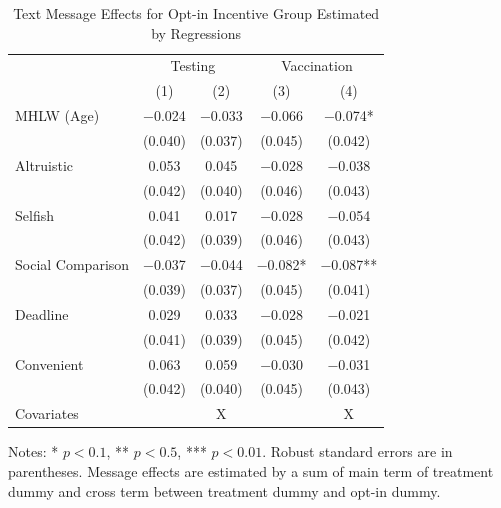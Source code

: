 \documentclass[
]{article}
\begin{document}
\begin{table}

\caption{\label{tab:lh-int}Text Message Effects for Opt-in Incentive Group Estimated by Regressions}
\centering
\fontsize{9}{11}\selectfont
\begin{threeparttable}
\begin{tabular}[t]{lcccc}
\toprule
\multicolumn{1}{c}{ } & \multicolumn{2}{c}{Testing} & \multicolumn{2}{c}{Vaccination} \\
\cmidrule(l{3pt}r{3pt}){2-3} \cmidrule(l{3pt}r{3pt}){4-5}
  & (1) & (2) & (3) & (4)\\
\midrule
MHLW (Age) & \num{-0.024} & \num{-0.033} & \num{-0.066} & \num{-0.074}*\\
 & (\num{0.040}) & (\num{0.037}) & (\num{0.045}) & (\num{0.042})\\
Altruistic & \num{0.053} & \num{0.045} & \num{-0.028} & \num{-0.038}\\
 & (\num{0.042}) & (\num{0.040}) & (\num{0.046}) & (\num{0.043})\\
Selfish & \num{0.041} & \num{0.017} & \num{-0.028} & \num{-0.054}\\
 & (\num{0.042}) & (\num{0.039}) & (\num{0.046}) & (\num{0.043})\\
Social Comparison & \num{-0.037} & \num{-0.044} & \num{-0.082}* & \num{-0.087}**\\
 & (\num{0.039}) & (\num{0.037}) & (\num{0.045}) & (\num{0.041})\\
Deadline & \num{0.029} & \num{0.033} & \num{-0.028} & \num{-0.021}\\
 & (\num{0.041}) & (\num{0.039}) & (\num{0.045}) & (\num{0.042})\\
Convenient & \num{0.063} & \num{0.059} & \num{-0.030} & \num{-0.031}\\
 & (\num{0.042}) & (\num{0.040}) & (\num{0.045}) & (\num{0.043})\\
Covariates &  & X &  & X\\
\bottomrule
\end{tabular}
\begin{tablenotes}
\item Notes: * $p < 0.1$, ** $p < 0.5$, *** $p < 0.01$. Robust standard errors are in parentheses. Message effects are estimated by a sum of main term of treatment dummy and cross term between treatment dummy and opt-in dummy.
\end{tablenotes}
\end{threeparttable}
\end{table}
\end{document}
